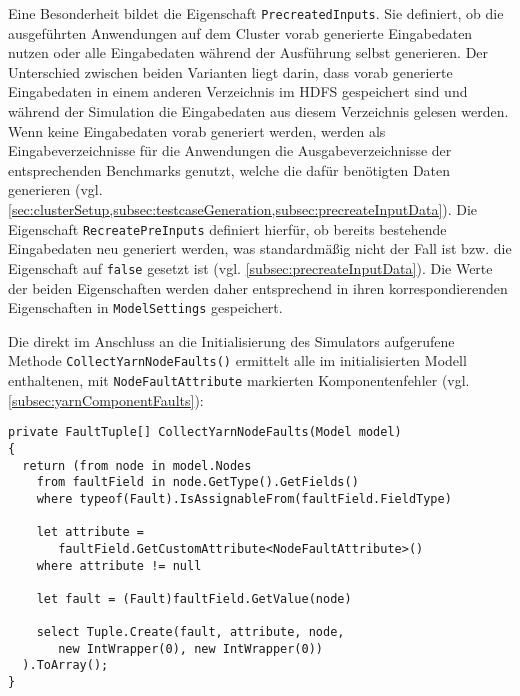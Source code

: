Eine Besonderheit bildet die Eigenschaft \texttt{PrecreatedInputs}.
Sie definiert, ob die ausgeführten Anwendungen auf dem Cluster vorab generierte Eingabedaten nutzen oder alle Eingabedaten während der Ausführung selbst generieren.
Der Unterschied zwischen beiden Varianten liegt darin, dass vorab generierte Eingabedaten in einem anderen Verzeichnis im HDFS gespeichert sind und während der Simulation die Eingabedaten aus diesem Verzeichnis gelesen werden.
Wenn keine Eingabedaten vorab generiert werden, werden als Eingabeverzeichnisse für die Anwendungen die Ausgabeverzeichnisse der entsprechenden Benchmarks genutzt, welche die dafür benötigten Daten generieren (vgl. \cref{sec:clusterSetup,subsec:testcaseGeneration,subsec:precreateInputData}).
Die Eigenschaft \texttt{RecreatePreInputs} definiert hierfür, ob bereits bestehende Eingabedaten neu generiert werden, was standardmäßig nicht der Fall ist bzw. die Eigenschaft auf \texttt{false} gesetzt ist (vgl. \cref{subsec:precreateInputData}).
Die Werte der beiden Eigenschaften werden daher entsprechend in ihren korrespondierenden Eigenschaften in \texttt{ModelSettings} gespeichert.

Die direkt im Anschluss an die Initialisierung des Simulators aufgerufene Methode \texttt{CollectYarnNodeFaults()} ermittelt alle im initialisierten Modell enthaltenen, mit \texttt{NodeFaultAttribute} markierten Komponentenfehler (vgl. \cref{subsec:yarnComponentFaults}):

\begin{lstlisting}[label=lst:hadoopSimulationCollectFaults,style=cs,
caption={[Ermitteln der Komponentenfehler mit dem NodeFaultAttribute]
    Ermitteln der Komponentenfehler mit dem \texttt{NodeFaultAttribute}}]
private FaultTuple[] CollectYarnNodeFaults(Model model)
{
  return (from node in model.Nodes      
    from faultField in node.GetType().GetFields()
    where typeof(Fault).IsAssignableFrom(faultField.FieldType)
    
    let attribute =
       faultField.GetCustomAttribute<NodeFaultAttribute>()
    where attribute != null
    
    let fault = (Fault)faultField.GetValue(node)
    
    select Tuple.Create(fault, attribute, node,
       new IntWrapper(0), new IntWrapper(0))
  ).ToArray();
}
\end{lstlisting}

